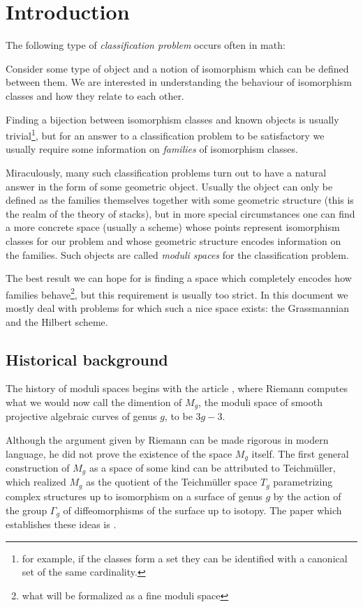 \chapter{Introduction}
The following type of \textit{classification problem} occurs often in math:
\begin{center}
Consider some type of object and a notion of isomorphism which can be defined between them. We are interested in understanding the behaviour of isomorphism classes and how they relate to each other.
\end{center}
Finding a bijection between isomorphism classes and known objects is usually trivial\footnote{for example, if the classes form a set they can be identified with a canonical set of the same cardinality.}, but for an answer to a classification problem to be satisfactory we usually require some information on \textit{families} of isomorphism classes.\medskip

Miraculously, many such classification problems turn out to have a natural answer in the form of some geometric object. Usually the object can only be defined as the families themselves together with some geometric structure (this is the realm of the theory of stacks), but in more special circumstances one can find a more concrete space (usually a scheme) whose points represent isomorphism classes for our problem and whose geometric structure encodes information on the families. Such objects are called \textit{moduli spaces} for the classification problem.\medskip

The best result we can hope for is finding a space which completely encodes how families behave\footnote{what will be formalized as a fine moduli space}, but this requirement is usually too strict.
In this document we mostly deal with problems for which such a nice space exists: the Grassmannian and the Hilbert scheme.\medskip



\section*{Historical background}
The history of moduli spaces begins with the article \cite{riemann54theorie}, where Riemann computes what we would now call the dimention of $M_g$, the moduli space of smooth projective algebraic curves of genus $g$, to be $3g-3$.\medskip

Although the argument given by Riemann can be made rigorous in modern language, he did not prove the existence of the space $M_g$ itself. The first general construction of $M_g$ as a space of some kind can be attributed to Teichm\"uller, which realized $M_g$ as the quotient of the Teichm\"uller space $T_g$ parametrizing complex structures up to isomorphism on a surface of genus $g$ by the action of the group $\Gamma_g$ of diffeomorphisms of the surface up to isotopy. The paper which establishes these ideas is \cite{teichmuller1939extremale}.\medskip

